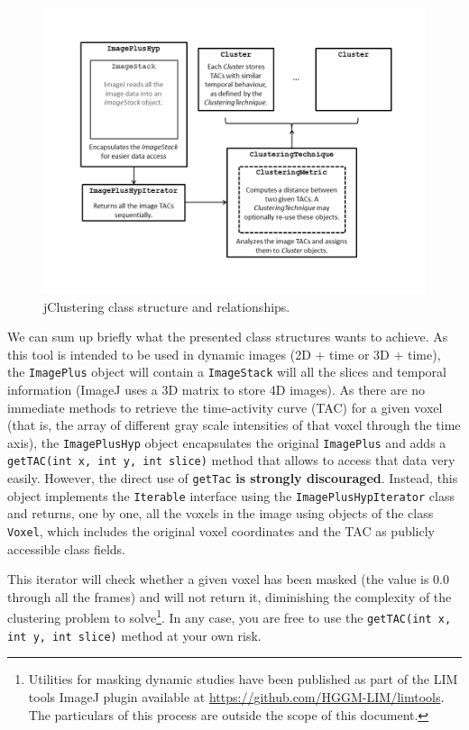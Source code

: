 \documentclass[11pt]{article} %
\begin{document}
\begin{figure}[htbp]
  \centering
    \includegraphics[width=\textwidth]{figures/class_structure}
  \caption{jClustering class structure and relationships.}
  \label{fig:class_structure}
\end{figure}

We can sum up briefly what the presented class structures wants to achieve. As this tool is intended to be used in dynamic images (2D + time or 3D + time), the {\tt ImagePlus} object will contain a {\tt ImageStack} will all the slices and temporal information (ImageJ uses a 3D matrix to store 4D images). As there are no immediate methods to retrieve the time-activity curve (TAC) for a given voxel (that is, the array of different gray scale intensities of that voxel through the time axis), the {\tt ImagePlusHyp} object encapsulates the original {\tt ImagePlus} and adds a {\tt getTAC(int x, int y, int slice)} method that allows to access that data very easily. However, the direct use of {\tt getTac} {\bf is strongly discouraged}. Instead, this object implements the {\tt Iterable} interface using the {\tt ImagePlusHypIterator} class and returns, one by one, all the voxels in the image using objects of the class {\tt Voxel}, which includes the original voxel coordinates and the TAC as publicly accessible class fields. 

This iterator will check whether a given voxel has been masked (the value is 0.0 through all the frames) and will not return it, diminishing the complexity of the clustering problem to solve\footnote{Utilities for masking dynamic studies have been published as part of the LIM tools ImageJ plugin available at \url{https://github.com/HGGM-LIM/limtools}. The particulars of this process are outside the scope of this document.}. In any case, you are free to use the {\tt getTAC(int x, int y, int slice)} method at your own risk.
\end{document}
